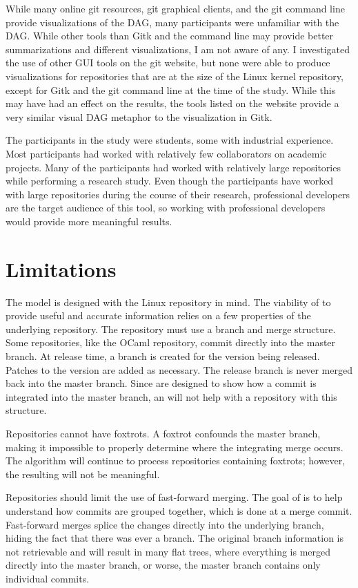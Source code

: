While many online git resources, git graphical clients, and the git
command line provide visualizations of the DAG,
many participants were unfamiliar with the DAG.
While other tools than Gitk and the command line may
provide better summarizations and different visualizations, I am not
aware of any. I investigated the use of other GUI tools on the git
website, but none were able to produce visualizations for repositories
that are at the size of the Linux kernel repository, except for Gitk and
the git command line at the time of the study.
While this may have had an effect on the results,
the tools listed on the website provide a very similar visual DAG
metaphor to the visualization in Gitk.

The participants in the study were students, some with industrial
experience. Most participants had worked with relatively few
collaborators on academic projects. Many of the participants had worked
with relatively large repositories while performing a research study.
Even though
the participants have worked with large repositories during the course
of their research, professional developers are the target audience of
this tool, so working with professional developers would provide more
meaningful results.

\section{Limitations}\label{sec:limitations}

The model is designed with the Linux repository in mind. The viability
of  to provide useful and accurate information relies on a few
properties of the underlying repository. The repository must use a
branch and merge structure. Some repositories, like the OCaml
repository, commit directly into the master branch. At release time, a
branch is created for the version being released. Patches to the version
are added as necessary. The release branch is never merged back into the
master branch. Since  are designed to show how a commit is
integrated into the master branch, an \mt{} will not help with a
repository with this structure.

Repositories cannot have foxtrots. A foxtrot confounds the master
branch, making it impossible to properly determine where the integrating
merge occurs. The algorithm will continue to process repositories
containing foxtrots; however, the resulting  will not be
meaningful.

Repositories should limit the use of fast-forward merging. The goal of
 is to help understand how commits are grouped together, which is
done at a merge commit. Fast-forward merges splice the changes directly
into the underlying branch, hiding the fact that there was ever a
branch. The original branch information is not retrievable and will
result in many flat trees, where everything is merged directly into the
master branch, or worse, the master branch contains only individual
commits.

